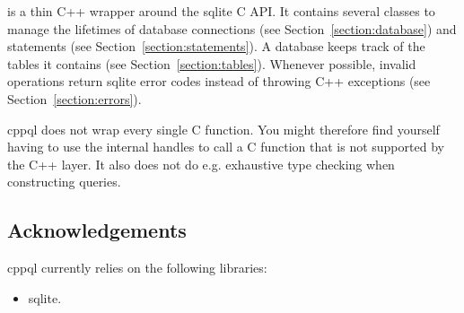  is a thin C++ wrapper around the sqlite C API. It contains several classes to manage the lifetimes of database connections (see Section~\ref{section:database}) and statements (see Section~\ref{section:statements}). A database keeps track of the tables it contains (see Section~\ref{section:tables}). Whenever possible, invalid operations return sqlite error codes instead of throwing C++ exceptions (see Section~\ref{section:errors}).

cppql does not wrap every single C function. You might therefore find yourself having to use the internal handles to call a C function that is not supported by the C++ layer. It also does not do e.g. exhaustive type checking when constructing queries.

\subsection{Acknowledgements}
\label{section:introduction:acknowledgements}

cppql currently relies on the following libraries:
\begin{itemize}
	\item {} sqlite\cite{sqlite}.
\end{itemize}